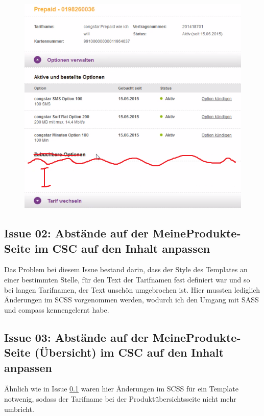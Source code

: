 \documentclass[11pt,a4paper]{article} %
\begin{document}
\begin{figure}[h]
\includegraphics[width=\textwidth]{images/optionenzubuchun.png}
\centering
\end{figure}


\subsection{Issue 02: Abstände auf der MeineProdukte-Seite im CSC auf den Inhalt anpassen} \label{sec:issue02}

Das Problem bei diesem Issue bestand darin, dass der Style des Templates an einer bestimmten Stelle, für den Text
der Tarifnamen fest definiert war und so bei langen Tarifnamen, der Text unschön umgebrochen ist.
Hier mussten lediglich Änderungen im SCSS vorgenommen werden, wodurch ich den Umgang mit SASS und compass
kennengelernt habe.


\subsection{Issue 03: Abstände auf der MeineProdukte-Seite (Übersicht) im CSC auf den Inhalt anpassen} 

Ähnlich wie in Issue \ref{sec:issue02} waren hier Änderungen im SCSS für ein Template notwenig, sodass
der Tarifname bei der Produktübersichtsseite nicht mehr umbricht.
\end{document}
